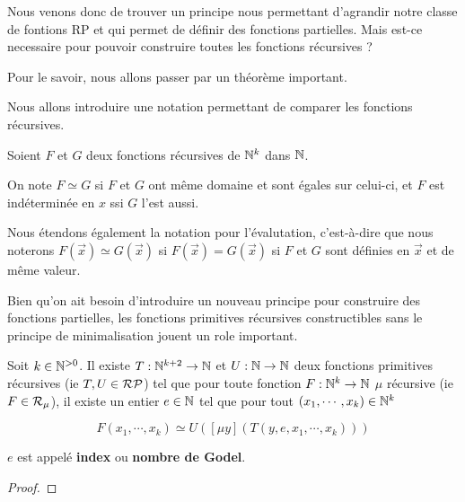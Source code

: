 Nous venons donc de trouver un principe nous permettant d'agrandir notre classe
de fontions RP et qui permet de définir des fonctions partielles. Mais est-ce
necessaire pour pouvoir construire toutes les fonctions récursives ?

Pour le savoir, nous allons passer par un théorème important.

Nous allons introduire une notation permettant de comparer les fonctions
récursives.

\begin{definition} 
	Soient $F$ et $G$ deux fonctions récursives de $\mathbb{N}^{k}$
	dans $\mathbb{N}$.

	On note $F \simeq G$ si $F$ et $G$ ont même domaine et
	sont égales sur celui-ci, et $F$ est indéterminée en $x$ ssi $G$ l'est
	aussi.

	Nous étendons également la notation pour l'évalutation, c'est-à-dire que
	nous noterons $F(\vec{x}) \simeq G(\vec{x})$ si $F(\vec{x}) = G(\vec{x})$ si
	$F$ et $G$ sont définies en $\vec{x}$ et de même valeur.
\end{definition}

Bien qu'on ait besoin d'introduire un nouveau principe pour construire des
fonctions partielles, les fonctions primitives récursives constructibles sans le
principe de minimalisation jouent un role important.

\begin{theorem} 
	\label{theorem:kleene_normal_form}
	Soit $k \in \mathbb{N}^{> 0}$.
	Il existe $T : \mathbb{N}^{k + 2} \rightarrow \mathbb{N}$ et
	$U : \mathbb{N} \rightarrow \mathbb{N}$ deux fonctions primitives récursives
	(ie $T, U \in \mathcal{RP}$) tel que pour toute fonction
	$F : \mathbb{N}^{k} \rightarrow \mathbb{N}$ $\mu$ récursive (ie $F \in
	\mathcal{R}_{\mu}$), il existe un entier $e \in \mathbb{N}$ tel que pour
	tout $(x_{1}, \cdots, x_{k}) \in \mathbb{N}^{k}$

	\begin{equation*}
		F(x_{1}, \cdots, x_{k}) \simeq U([\mu y](T(y, e, x_{1}, \cdots, x_{k})))
	\end{equation*}

	$e$ est appelé \textbf{index} ou \textbf{nombre de Godel}.
\end{theorem}

\ifdefined\outputproof
\begin{proof}

\end{proof}
\fi

